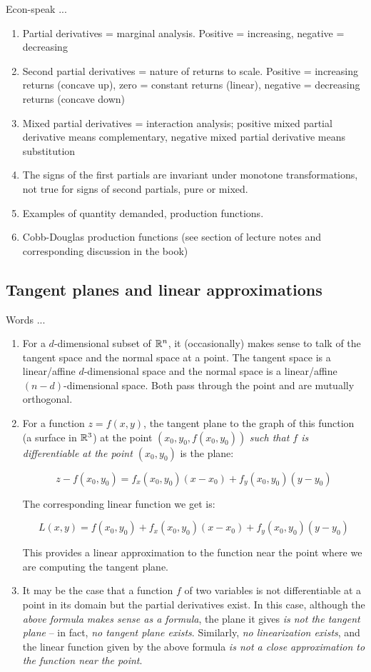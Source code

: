 \documentclass[10pt]{amsart}
\begin{document}
Econ-speak ...

\begin{enumerate}
\item Partial derivatives = marginal analysis. Positive = increasing,
  negative = decreasing
\item Second partial derivatives = nature of returns to
  scale. Positive = increasing returns (concave up), zero = constant
  returns (linear), negative = decreasing returns (concave down)
\item Mixed partial derivatives = interaction analysis; positive mixed
  partial derivative means complementary, negative mixed partial
  derivative means substitution
\item The signs of the first partials are invariant under monotone
  transformations, not true for signs of second partials, pure or
  mixed.
\item Examples of quantity demanded, production functions.
\item Cobb-Douglas production functions (see section of lecture notes
  and corresponding discussion in the book)
\end{enumerate}

\subsection{Tangent planes and linear approximations}

Words ...

\begin{enumerate}
\item For a $d$-dimensional subset of $\mathbb{R}^n$, it (occasionally) makes
  sense to talk of the tangent space and the normal space at a
  point. The tangent space is a linear/affine $d$-dimensional space
  and the normal space is a linear/affine $(n - d)$-dimensional
  space. Both pass through the point and are mutually orthogonal.
\item For a function $z = f(x,y)$, the tangent plane to the graph of
  this function (a surface in $\mathbb{R}^3$) at the point
  $(x_0,y_0,f(x_0,y_0))$ {\em such that $f$ is differentiable at the
    point $(x_0,y_0)$} is the plane:

  $$z - f(x_0,y_0) = f_x(x_0,y_0)(x - x_0) + f_y(x_0,y_0)(y - y_0)$$

  The corresponding linear function we get is:

  $$L(x,y) = f(x_0,y_0) + f_x(x_0,y_0)(x - x_0) + f_y(x_0,y_0)(y - y_0)$$

  This provides a linear approximation to the function near the point
  where we are computing the tangent plane.
\item It may be the case that a function $f$ of two variables is not
  differentiable at a point in its domain but the partial derivatives
  exist. In this case, although the {\em above formula makes sense as
    a formula}, the plane it gives {\em is not the tangent plane} --
  in fact, {\em no tangent plane exists}. Similarly, {\em no
    linearization exists}, and the linear function given by the above
  formula {\em is not a close approximation to the function near the
    point}.
\end{enumerate}
\end{document}

